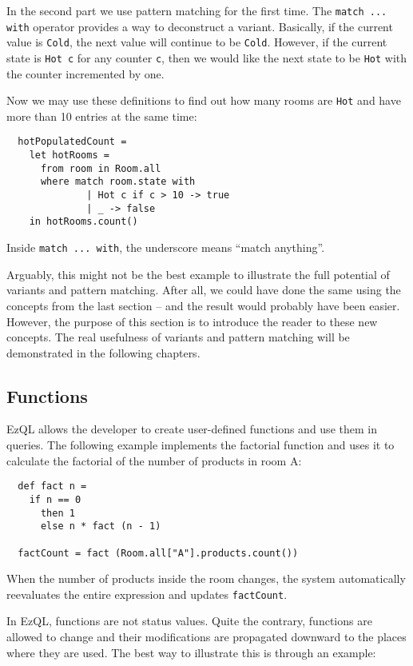 \documentclass[a4,11pt]{report}
\begin{document}
In the second part we use pattern matching for the first time. The
\verb=match ... with= operator provides a way to deconstruct a
variant. Basically, if the current value is \verb=Cold=, the next
value will continue to be \verb=Cold=. However, if the current state
is \verb=Hot c= for any counter \verb=c=, then we would like the next
state to be \verb=Hot= with the counter incremented by one.

Now we may use these definitions to find out how many rooms are
\verb=Hot= and have more than 10 entries at the same time:

\begin{lstlisting}
  hotPopulatedCount =
    let hotRooms =
      from room in Room.all
      where match room.state with
              | Hot c if c > 10 -> true
              | _ -> false
    in hotRooms.count()
\end{lstlisting}

Inside \verb=match ... with=, the underscore means ``match anything''.

Arguably, this might not be the best example to illustrate the full
potential of variants and pattern matching. After all, we could have
done the same using the concepts from the last section -- and the
result would probably have been easier. However, the purpose of this
section is to introduce the reader to these new concepts. The real
usefulness of variants and pattern matching will be demonstrated in
the following chapters.

\subsection{Functions}

EzQL allows the developer to create user-defined functions and use
them in queries. The following example implements the factorial
function and uses it to calculate the factorial of the number of
products in room A:

\begin{lstlisting}
  def fact n =
    if n == 0
      then 1
      else n * fact (n - 1)

  factCount = fact (Room.all["A"].products.count())
\end{lstlisting}

When the number of products inside the room changes, the system
automatically reevaluates the entire expression and updates
\verb=factCount=.

In EzQL, functions are not status values. Quite the contrary,
functions are allowed to change and their modifications are propagated
downward to the places where they are used. The best way to illustrate
this is through an example:
\end{document}

